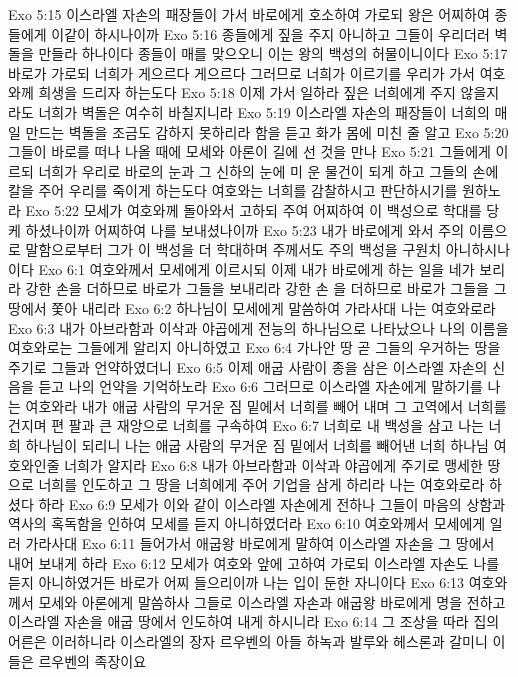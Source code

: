 Exo 5:15  이스라엘 자손의 패장들이 가서 바로에게 호소하여 가로되 왕은 어찌하여 종들에게 이같이 하시나이까
Exo 5:16  종들에게 짚을 주지 아니하고 그들이 우리더러 벽돌을 만들라 하나이다 종들이 매를 맞으오니 이는 왕의 백성의 허물이니이다
Exo 5:17  바로가 가로되 너희가 게으르다 게으르다 그러므로 너희가 이르기를 우리가 가서 여호와께 희생을 드리자 하는도다
Exo 5:18  이제 가서 일하라 짚은 너희에게 주지 않을지라도 너희가 벽돌은 여수히 바칠지니라
Exo 5:19  이스라엘 자손의 패장들이 너희의 매일 만드는 벽돌을 조금도 감하지 못하리라 함을 듣고 화가 몸에 미친 줄 알고
Exo 5:20  그들이 바로를 떠나 나올 때에 모세와 아론이 길에 선 것을 만나
Exo 5:21  그들에게 이르되 너희가 우리로 바로의 눈과 그 신하의 눈에 미 운 물건이 되게 하고 그들의 손에 칼을 주어 우리를 죽이게 하는도다 여호와는 너희를 감찰하시고 판단하시기를 원하노라
Exo 5:22  모세가 여호와께 돌아와서 고하되 주여 어찌하여 이 백성으로 학대를 당케 하셨나이까 어찌하여 나를 보내셨나이까
Exo 5:23  내가 바로에게 와서 주의 이름으로 말함으로부터 그가 이 백성을 더 학대하며 주께서도 주의 백성을 구원치 아니하시나이다
Exo 6:1  여호와께서 모세에게 이르시되 이제 내가 바로에게 하는 일을 네가 보리라 강한 손을 더하므로 바로가 그들을 보내리라 강한 손 을 더하므로 바로가 그들을 그 땅에서 쫓아 내리라
Exo 6:2  하나님이 모세에게 말씀하여 가라사대 나는 여호와로라
Exo 6:3  내가 아브라함과 이삭과 야곱에게 전능의 하나님으로 나타났으나 나의 이름을 여호와로는 그들에게 알리지 아니하였고
Exo 6:4  가나안 땅 곧 그들의 우거하는 땅을 주기로 그들과 언약하였더니
Exo 6:5  이제 애굽 사람이 종을 삼은 이스라엘 자손의 신음을 듣고 나의 언약을 기억하노라
Exo 6:6  그러므로 이스라엘 자손에게 말하기를 나는 여호와라 내가 애굽 사람의 무거운 짐 밑에서 너희를 빼어 내며 그 고역에서 너희를 건지며 편 팔과 큰 재앙으로 너희를 구속하여
Exo 6:7  너희로 내 백성을 삼고 나는 너희 하나님이 되리니 나는 애굽 사람의 무거운 짐 밑에서 너희를 빼어낸 너희 하나님 여호와인줄 너희가 알지라
Exo 6:8  내가 아브라함과 이삭과 야곱에게 주기로 맹세한 땅으로 너희를 인도하고 그 땅을 너희에게 주어 기업을 삼게 하리라 나는 여호와로라 하셨다 하라
Exo 6:9  모세가 이와 같이 이스라엘 자손에게 전하나 그들이 마음의 상함과 역사의 혹독함을 인하여 모세를 듣지 아니하였더라
Exo 6:10  여호와께서 모세에게 일러 가라사대
Exo 6:11  들어가서 애굽왕 바로에게 말하여 이스라엘 자손을 그 땅에서 내어 보내게 하라
Exo 6:12  모세가 여호와 앞에 고하여 가로되 이스라엘 자손도 나를 듣지 아니하였거든 바로가 어찌 들으리이까 나는 입이 둔한 자니이다
Exo 6:13  여호와께서 모세와 아론에게 말씀하사 그들로 이스라엘 자손과 애굽왕 바로에게 명을 전하고 이스라엘 자손을 애굽 땅에서 인도하여 내게 하시니라
Exo 6:14  그 조상을 따라 집의 어른은 이러하니라 이스라엘의 장자 르우벤의 아들 하녹과 발루와 헤스론과 갈미니 이들은 르우벤의 족장이요

